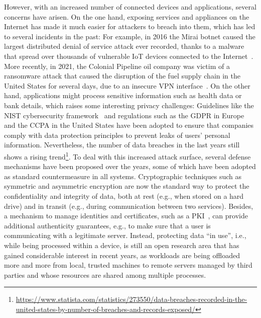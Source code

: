 However, with an increased number of connected devices and applications, several
concerns have arisen. On the one hand, exposing services and appliances on the
Internet has made it much easier for attackers to breach into them, which has
led to several incidents in the past: For example, in 2016 the Mirai botnet
caused the largest distributed denial of service attack ever recorded, thanks to
a malware that spread over thousands of vulnerable \ac{IoT} devices connected to
the Internet~\cite{miraiBotnet}. More recently, in 2021, the Colonial Pipeline
oil company was victim of a ransomware attack that caused the disruption of the
fuel supply chain in the United States for several days, due to an insecure VPN
interface~\cite{colonialPipelineAttack}. On the other hand, applications might
process sensitive information such as health data or bank details, which raises
some interesting privacy challenges: Guidelines like the NIST cybersecurity
framework~\cite{nistcsf} and regulations such as the \ac{GDPR} in Europe and the
\ac{CCPA} in the United States have been adopted to ensure that companies comply
with data protection principles to prevent leaks of users' personal information.
Nevertheless, the number of data breaches in the last years still shows a rising
trend\footnote{\url{https://www.statista.com/statistics/273550/data-breaches-recorded-in-the-united-states-by-number-of-breaches-and-records-exposed/}}.
To deal with this increased attack surface, several defense mechanisms have been
proposed over the years, some of which have been adopted as standard
countermeasure in all systems. Cryptographic techniques such as symmetric and
asymmetric encryption are now the standard way to protect the confidentiality
and integrity of data, both at rest (e.g., when stored on a hard drive) and in
transit (e.g., during communication between two services). Besides, a mechanism
to manage identities and certificates, such as a \ac{PKI}~\cite{pki}, can
provide additional authenticity guarantees, e.g., to make sure that a user is
communicating with a legitimate server. Instead, protecting data ``in use'',
i.e., while being processed within a device, is still an open research area that
has gained considerable interest in recent years, as workloads are being
offloaded more and more from local, trusted machines to remote servers managed
by third parties and whose resources are shared among multiple processes.

